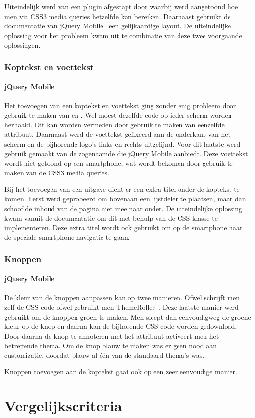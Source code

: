 Uiteindelijk werd van een plugin afgestapt door \cite{Hadlock2012} waarbij werd aangetoond hoe men via CSS3 media queries hetzelfde kan bereiken. Daarnaast gebruikt de documentatie van jQuery Mobile~\cite{JQuery2012b} een gelijkaardige layout. De uiteindelijke oplossing voor het probleem kwam uit te combinatie van deze twee voorgaande oplossingen.

\subsubsection{Koptekst en voettekst}

\paragraph{jQuery Mobile}
Het toevoegen van een koptekst en voettekst ging zonder enig probleem door gebruik te maken van  en . Wel moest dezelfde code op ieder scherm worden herhaald. Dit kan worden vermeden door gebruik te maken van eenzelfde  attribuut. Daarnaast werd de voettekst gefixeerd aan de onderkant van het scherm en de bijhorende logo's links en rechts uitgelijnd. Voor dit laatste werd gebruik gemaakt van de zogenaamde  die jQuery Mobile aanbiedt. Deze voettekst wordt niet getoond op een smartphone, wat wordt bekomen door gebruik te maken van de CSS3 media queries.

Bij het toevoegen van een uitgave dient er een extra titel onder de koptekst te komen. Eerst werd geprobeerd om bovenaan een lijstdeler te plaatsen, maar dan schoof de inhoud van de pagina niet mee naar onder. De uiteindelijke oplossing kwam vanuit de documentatie \cite{JQuery2013b} om dit met behulp van de  CSS klasse te implementeren. Deze extra titel wordt ook gebruikt om op de smartphone naar de speciale smartphone navigatie te gaan.

\subsubsection{Knoppen}

\paragraph{jQuery Mobile} 
De kleur van de knoppen aanpassen kan op twee manieren. Ofwel schrijft men zelf de CSS-code ofwel gebruikt men ThemeRoller~\cite{JQuery2012c}. Deze laatste manier werd gebruikt om de knoppen groen te maken. Men sleept dan eenvoudigweg de groene kleur op de knop en daarna kan de bijhorende CSS-code worden gedownload. Door daarna de knop te annoteren met het  attribuut activeert men het betreffende thema. Om de knop blauw te maken was er geen nood aan customizatie, doordat blauw al één van de standaard thema's was.

Knoppen toevoegen aan de koptekst gaat ook op een zeer eenvoudige manier.


\section{Vergelijkscriteria}
\label{sec:evaluatie-criteria}